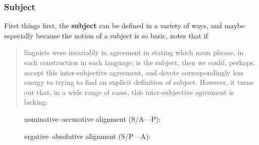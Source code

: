 \subsubsection{Subject}

First things first, the \textbf{subject} can be defined in a variety of ways,
and maybe especially because the notion of a subject is so basic,
\citet{comrie1989} notes that if

\blockcquote[104]{comrie1989}{linguists were invariably in agreement in stating
which noun phrase, in each construction in each language, is the subject, then
we could, perhaps, accept this inter-subjective agreement, and devote
correspondingly less energy to trying to find an explicit definition of
subject. However, it turns out that, in a wide range of cases, this
inter-subjective agreement is lacking.}

\begin{figure}[t]
\pex\label{ex:subject}
\a\label{ex:subject_nomacc}%
nominative--accusative alignment (S/A---P):\medskip


\a\label{ex:subject_ergabs}%
ergative--absolutive alignment (S/P---A):\medskip


\xe
\end{figure}


